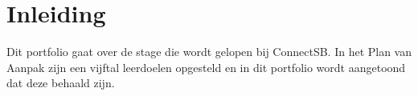 \section{Inleiding}
Dit portfolio gaat over de stage die wordt gelopen bij ConnectSB. In het Plan van Aanpak zijn een vijftal leerdoelen opgesteld en in dit portfolio wordt aangetoond dat deze behaald zijn.